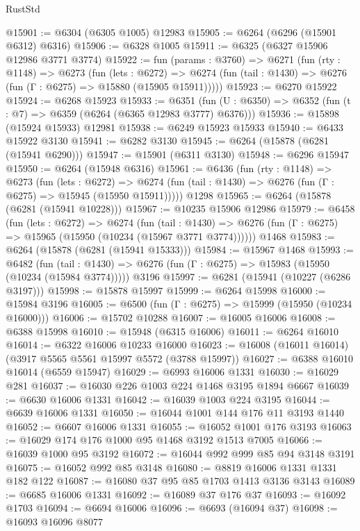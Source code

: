 \begin{lexlean}{RustStd}
\begin{coremodule}
@15901 := @6304 (@6305 @1005) @12983
@15905 := @6264 (@6296 (@15901 @6312) @6316)
@15906 := @6328 @1005
@15911 := @6325 (@6327 @15906 @12986 @3771 @3774)
@15922 := fun (params : @3760) =>
  @6271
    (fun (rty : @1148) =>
    @6273
      (fun (lets : @6272) =>
      @6274 (fun (tail : @1430) => @6276 (fun (Γ : @6275) => @15880 (@15905 @15911)))))
@15923 := @6270 @15922
@15924 := @6268 @15923
@15933 := @6351
    (fun (U : @6350) => @6352 (fun (t : @7) => @6359 (@6264 (@6365 @12983 @3777) @6376)))
@15936 := @15898 (@15924 @15933) @12981
@15938 := @6249 @15923 @15933
@15940 := @6433 @15922 @3130
@15941 := @6282 @3130
@15945 := @6264 (@15878 (@6281 (@15941 @6290)))
@15947 := @15901 (@6311 @3130)
@15948 := @6296 @15947
@15950 := @6264 (@15948 @6316)
@15961 := @6436
    (fun (rty : @1148) =>
    @6273
      (fun (lets : @6272) =>
      @6274 (fun (tail : @1430) => @6276 (fun (Γ : @6275) => @15945 (@15950 @15911)))))
    @1298
@15965 := @6264 (@15878 (@6281 (@15941 @10228)))
@15967 := @10235 @15906 @12986
@15979 := @6458
    (fun (lets : @6272) =>
    @6274
      (fun (tail : @1430) =>
      @6276 (fun (Γ : @6275) => @15965 (@15950 (@10234 (@15967 @3771 @3774))))))
    @1468
@15983 := @6264 (@15878 (@6281 (@15941 @15333)))
@15984 := @15967 @1468
@15993 := @6482
    (fun (tail : @1430) => @6276 (fun (Γ : @6275) => @15983 (@15950 (@10234 (@15984 @3774)))))
    @3196
@15997 := @6281 (@15941 (@10227 (@6286 @3197)))
@15998 := @15878 @15997
@15999 := @6264 @15998
@16000 := @15984 @3196
@16005 := @6500 (fun (Γ : @6275) => @15999 (@15950 (@10234 @16000)))
@16006 := @15702 @10288
@16007 := @16005 @16006
@16008 := @6388 @15998
@16010 := @15948 (@6315 @16006)
@16011 := @6264 @16010
@16014 := @6322 @16006 @10233 @16000
@16023 := @16008 (@16011 @16014) (@3917 @5565 @5561 @15997 @5572 (@3788 @15997))
@16027 := @6388 @16010 @16014 (@6559 @15947)
@16029 := @6993 @16006 @1331
@16030 := @16029 @281
@16037 := @16030 @226 @1003 @224 @1468 @3195 @1894 @6667
@16039 := @6630 @16006 @1331
@16042 := @16039 @1003 @224 @3195
@16044 := @6639 @16006 @1331
@16050 := @16044 @1001 @144 @176 @11 @3193 @1440
@16052 := @6607 @16006 @1331
@16055 := @16052 @1001 @176 @3193
@16063 := @16029 @174 @176 @1000 @95 @1468 @3192 @1513 @7005
@16066 := @16039 @1000 @95 @3192
@16072 := @16044 @992 @999 @85 @94 @3148 @3191
@16075 := @16052 @992 @85 @3148
@16080 := @8819 @16006 @1331 @1331 @182 @122
@16087 := @16080 @37 @95 @85 @1703 @1413 @3136 @3143
@16089 := @6685 @16006 @1331
@16092 := @16089 @37 @176 @37
@16093 := @16092 @1703
@16094 := @6694 @16006
@16096 := @6693 (@16094 @37)
@16098 := @16093 @16096 @8077

\end{coremodule}
\end{lexlean}
